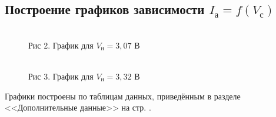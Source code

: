 \documentclass[12pt]{article}
\begin{document}
    \subsection{Построение графиков зависимости $I_а = f(V_с)$}

      \begin{figure}[h!]
        \begin{minipage}[h]{0.49\linewidth}
            \\
            Рис 2. График для $V_н = 3,07$ В
        \end{minipage}
        \begin{minipage}[h]{0.49\linewidth}
            \\
            Рис 3. График для $V_н = 3,32$ В
        \end{minipage}
        \label{fig:static_plots}
      \end{figure}

      Графики построены по таблицам данных, приведённым в разделе
      <<Дополнительные данные>> на стр. \pageref{table:static_method}.
\end{document}
